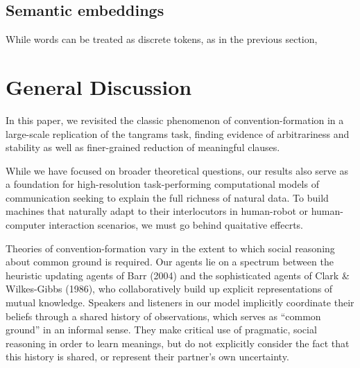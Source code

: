 \documentclass[alpha-refs]{wiley-article}
\begin{document}
\subsection{Semantic embeddings}\label{arbitrariness-and-stability}

While words can be treated as discrete tokens, as in the previous section, 


\section{General Discussion}\label{general-discussion}

In this paper, we revisited the classic phenomenon of
convention-formation in a large-scale replication of the tangrams task,
finding evidence of arbitrariness and stability as well as finer-grained
reduction of meaningful clauses. 

While we have focused on broader theoretical questions, our results also serve as a foundation for high-resolution task-performing computational models of communication seeking to explain the full richness of natural data. To build machines that naturally adapt to their interlocutors in human-robot or human-computer interaction scenarios, we must go behind quaitative effecrts.

Theories of convention-formation vary in the extent to which social
reasoning about common ground is required. Our agents lie on a spectrum
between the heuristic updating agents of Barr (2004) and the
sophisticated agents of Clark \& Wilkes-Gibbs (1986), who
collaboratively build up explicit representations of mutual knowledge.
Speakers and listeners in our model implicitly coordinate their beliefs
through a shared history of observations, which serves as ``common
ground'' in an informal sense. They make critical use of pragmatic,
social reasoning in order to learn meanings, but do not explicitly
consider the fact that this history is shared, or represent their
partner's own uncertainty.
\end{document}

